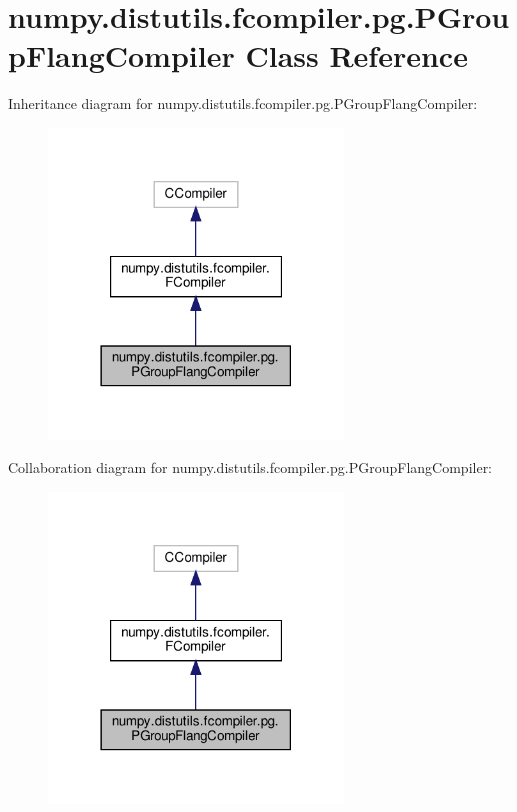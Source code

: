 \hypertarget{classnumpy_1_1distutils_1_1fcompiler_1_1pg_1_1PGroupFlangCompiler}{}\section{numpy.\+distutils.\+fcompiler.\+pg.\+P\+Group\+Flang\+Compiler Class Reference}
\label{classnumpy_1_1distutils_1_1fcompiler_1_1pg_1_1PGroupFlangCompiler}


Inheritance diagram for numpy.\+distutils.\+fcompiler.\+pg.\+P\+Group\+Flang\+Compiler\+:
\nopagebreak
\begin{figure}[H]
\begin{center}
\leavevmode
\includegraphics[width=222pt]{classnumpy_1_1distutils_1_1fcompiler_1_1pg_1_1PGroupFlangCompiler__inherit__graph}
\end{center}
\end{figure}


Collaboration diagram for numpy.\+distutils.\+fcompiler.\+pg.\+P\+Group\+Flang\+Compiler\+:
\nopagebreak
\begin{figure}[H]
\begin{center}
\leavevmode
\includegraphics[width=222pt]{classnumpy_1_1distutils_1_1fcompiler_1_1pg_1_1PGroupFlangCompiler__coll__graph}
\end{center}
\end{figure}
